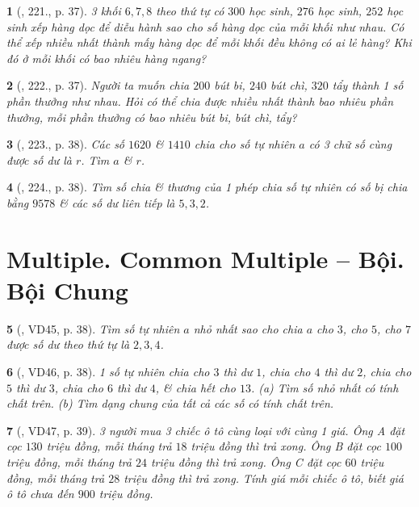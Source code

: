 \documentclass{article}
\newtheorem{baitoan}{}
\begin{document}
\begin{baitoan}[\cite{Binh_Toan_6_tap_1}, 221., p. 37]
	3 khối $6,7,8$ theo thứ tự có $300$ học sinh, $276$ học sinh, $252$ học sinh xếp hàng dọc để diễu hành sao cho số hàng dọc của mỗi khối như nhau. Có thể xếp nhiều nhất thành mấy hàng dọc để mỗi khối đều không có ai lẻ hàng? Khi đó ở mỗi khối có bao nhiêu hàng ngang?
\end{baitoan}

\begin{baitoan}[\cite{Binh_Toan_6_tap_1}, 222., p. 37]
	Người ta muốn chia $200$ bút bi, $240$ bút chì, $320$ tẩy thành 1 số phần thưởng như nhau. Hỏi có thể chia được nhiều nhất thành bao nhiêu phần thưởng, mỗi phần thưởng có bao nhiêu bút bi, bút chì, tẩy?
\end{baitoan}

\begin{baitoan}[\cite{Binh_Toan_6_tap_1}, 223., p. 38]
	Các số $1620$ \& $1410$ chia cho số tự nhiên $a$ có 3 chữ số cùng được số dư là $r$. Tìm $a$ \& $r$.
\end{baitoan}

\begin{baitoan}[\cite{Binh_Toan_6_tap_1}, 224., p. 38]
	Tìm số chia \& thương của 1 phép chia số tự nhiên có số bị chia bằng $9578$ \& các số dư liên tiếp là $5,3,2$.
\end{baitoan}


\section{Multiple. Common Multiple -- Bội. Bội Chung}

\begin{baitoan}[\cite{Binh_Toan_6_tap_1}, VD45, p. 38]
	Tìm số tự nhiên $a$ nhỏ nhất sao cho chia $a$ cho $3$, cho $5$, cho $7$ được số dư theo thứ tự là $2,3,4$.
\end{baitoan}

\begin{baitoan}[\cite{Binh_Toan_6_tap_1}, VD46, p. 38]
	1 số tự nhiên chia cho $3$ thì dư $1$, chia cho $4$ thì dư $2$, chia cho $5$ thì dư $3$, chia cho $6$ thì dư $4$, \& chia hết cho $13$. (a) Tìm số nhỏ nhất có tính chất trên. (b) Tìm dạng chung của tất cả các số có tính chất trên.
\end{baitoan}

\begin{baitoan}[\cite{Binh_Toan_6_tap_1}, VD47, p. 39]
	3 người mua 3 chiếc ô tô cùng loại với cùng 1 giá. Ông A đặt cọc $130$ triệu đồng, mỗi tháng trả $18$ triệu đồng thì trả xong. Ông B đặt cọc $100$ triệu đồng, mỗi tháng trả $24$ triệu đồng thì trả xong. Ông C đặt cọc $60$ triệu đồng, mỗi tháng trả $28$ triệu đồng thì trả xong. Tính giá mỗi chiếc ô tô, biết giá ô tô chưa đến $900$ triệu đồng.
\end{baitoan}
\end{document}
